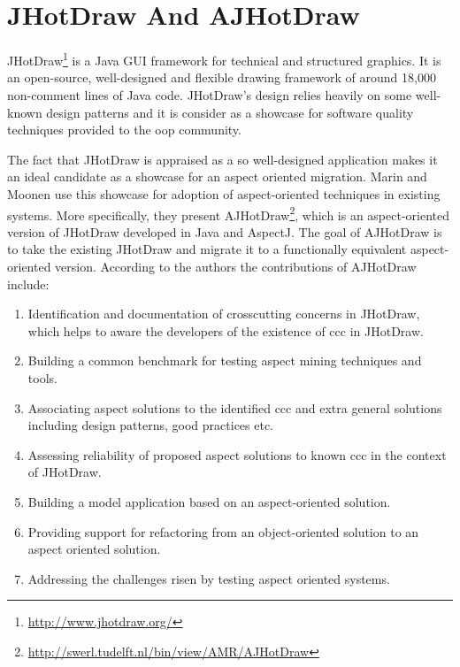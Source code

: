 \section{JHotDraw And AJHotDraw}\label{JHotDraw And AJHotDraw}
JHotDraw\footnote{\url{http://www.jhotdraw.org/}} is a Java GUI framework for technical and structured graphics. 
It is an open-source, well-designed and flexible drawing framework of around 18,000 non-comment lines of Java code. 
JHotDraw's  design relies heavily on some well-known design patterns\cite{gamma1995design} and it is consider as a showcase for software quality techniques provided to the \ac{oop} community. 

The fact that JHotDraw is appraised as a so well-designed application makes it an ideal candidate as a showcase for an aspect oriented migration. 
Marin and Moonen \cite{marinajhotdraw} use this showcase for adoption of aspect-oriented techniques in existing systems. 
More specifically, they present AJHotDraw\footnote{\url{http://swerl.tudelft.nl/bin/view/AMR/AJHotDraw}}, which is an aspect-oriented version of JHotDraw developed in Java and AspectJ. 
The goal of AJHotDraw is to take the existing JHotDraw and migrate it to a functionally equivalent aspect-oriented version. 
According to the authors the contributions of AJHotDraw include: 

\begin{enumerate}
	\item Identification and documentation of crosscutting concerns in JHotDraw, which helps to aware the developers of the existence of \ac{ccc} in JHotDraw.

	\item Building a common benchmark for testing aspect mining techniques and tools. 

	\item Associating aspect solutions to the identified \ac{ccc} and extra general solutions including design patterns, good practices etc. 

	\item Assessing reliability of proposed aspect solutions to known \ac{ccc} in the context of JHotDraw. 

	\item Building a model application based on an aspect-oriented solution.
	
	\item Providing support for refactoring from an object-oriented solution to an aspect oriented solution.
	
	\item Addressing the challenges risen by testing aspect oriented systems.
\end{enumerate}

